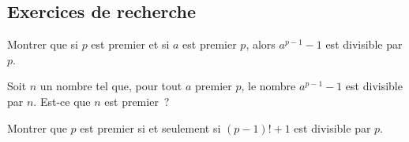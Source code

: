 \documentclass[a4paper,fleqn,openany]{trmbook}
\begin{document}
\begin{listeexercices}
\subsection{Exercices de recherche}

\begin{exercice}
Montrer que si $p$ est premier et si $a$ est premier  $p$, alors $a^{p-1}-1$ est divisible par $p$.
\end{exercice}

\begin{exercice}
Soit $n$ un nombre tel que, pour tout $a$ premier  $p$, le nombre $a^{p-1} - 1$ est divisible par $n$. Est-ce que $n$ est premier~?
\end{exercice}

\begin{exercice}
Montrer que $p$ est premier si et seulement si $(p-1)!+1$ est divisible par $p$.
\end{exercice}

\end{listeexercices}
\modenormal %
\end{document}
